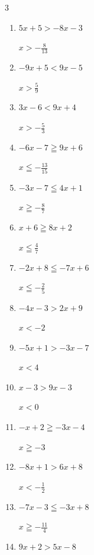 \begin{multicols}{3}
\begin{enumerate}
        $\displaystyle x\geqq 15$

  \item $5x+5>-8x-3$

        $\displaystyle x>-\frac{8}{13}$

  \item $-9x+5<9x-5$

        $\displaystyle x>\frac{5}{9}$

  \item $3x-6<9x+4$

        $\displaystyle x>-\frac{5}{3}$

  \item $-6x-7\geqq 9x+6$

        $\displaystyle x\leqq -\frac{13}{15}$

  \item $-3x-7\leqq 4x+1$

        $\displaystyle x\geqq -\frac{8}{7}$

\columnbreak %

  \item $x+6\geqq 8x+2$

        $\displaystyle x\leqq \frac{4}{7}$

  \item $-2x+8\leqq -7x+6$

        $\displaystyle x\leqq -\frac{2}{5}$

  \item $-4x-3>2x+9$

        $\displaystyle x<-2$

  \item $-5x+1>-3x-7$

        $\displaystyle x<4$

  \item $x-3>9x-3$

        $\displaystyle x<0$

  \item $-x+2\geqq -3x-4$

        $\displaystyle x\geqq -3$

  \item $-8x+1>6x+8$

        $\displaystyle x<-\frac{1}{2}$

  \item $-7x-3\leqq -3x+8$

        $\displaystyle x\geqq -\frac{11}{4}$

  \item $9x+2>5x-8$


\end{enumerate}
\end{multicols}
